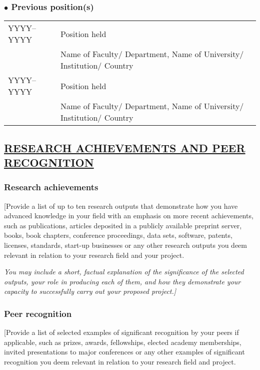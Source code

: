 \documentclass[b1]{erc} %
\begin{document}
\subsubsection*{$\bullet$ Previous position(s)}

\begin{tabular}{m{8em} m{32em}}
     YYYY--YYYY	& Position held \\
                & Name of Faculty/ Department, Name of University/ Institution/ Country \\
     YYYY--YYYY	& Position held \\
                & Name of Faculty/ Department, Name of University/ Institution/ Country \\
\end{tabular}

\subsection*{\underline{RESEARCH ACHIEVEMENTS AND PEER RECOGNITION}}

\subsubsection*{Research achievements}

[Provide a list of up to ten research outputs that demonstrate how you have advanced knowledge in your field with an emphasis on more recent achievements, such as publications, articles deposited in a publicly available preprint server, books, book chapters, conference proceedings, data sets, software, patents, licenses, standards, start-up businesses or any other research outputs you deem relevant in relation to your research field and your project.

\textit{You may include a short, factual explanation of the significance of the selected outputs, your role in producing each of them, and how they demonstrate your capacity to successfully carry out your proposed project.]}


\subsubsection*{Peer recognition}

[Provide a list of selected examples of significant recognition by your peers if applicable, such as prizes, awards, fellowships, elected academy memberships, invited presentations to major conferences or any other examples of significant recognition you deem relevant in relation to your research field and project.
\end{document}

